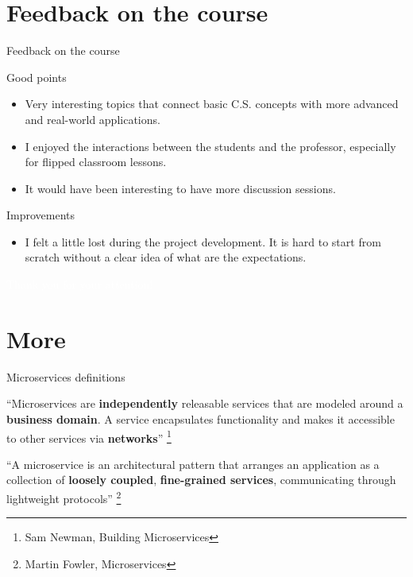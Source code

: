 \documentclass{beamer}
\begin{document}
\section{Feedback on the course}
\begin{frame}{Feedback on the course}
	\begin{block}{Good points}
		\begin{itemize}
			\item Very interesting topics that connect basic C.S. concepts with more advanced and real-world applications.
			\item I enjoyed the interactions between the students and the professor, especially for flipped classroom lessons.
			\item It would have been interesting to have more discussion sessions.
		\end{itemize}
	\end{block}
	\begin{block}{Improvements}
		\begin{itemize}
			\item I felt a little lost during the project development. It is hard to start from scratch without a clear idea of what are the expectations.
		\end{itemize}
	\end{block}
\end{frame}


\begin{frame}{}
	\begin{center}
		\Huge{\textcolor{white}{Thank you for your attention!}}
	\end{center}
\end{frame}

\section{More}
\begin{frame}{Microservices definitions}
	\label{microservices_definitions}
	\begin{block}{}
		“Microservices are \textbf{independently} releasable services that are modeled around a \textbf{business domain}. A service encapsulates functionality and makes it accessible to other services via \textbf{networks}” \footnote{Sam Newman, Building Microservices}
	\end{block}
	\begin{block}{}
		“A microservice is an architectural pattern that arranges an application as a collection of \textbf{loosely coupled}, \textbf{fine-grained services}, communicating through lightweight protocols” \footnote{Martin Fowler, Microservices}
	\end{block}

\hyperlink{index_1}{}
\end{frame}
\end{document}
